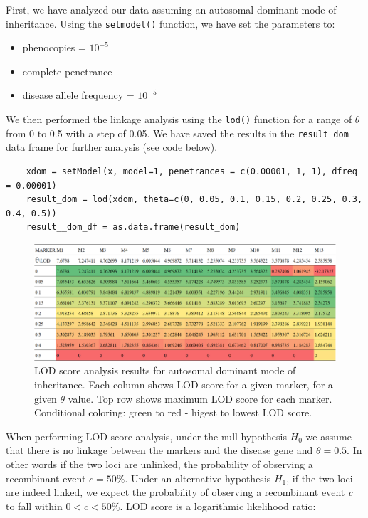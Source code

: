 \documentclass[a4paper,12pt]{article}
\begin{document}
First, we have analyzed our data assuming an autosomal dominant mode of inheritance. Using the \texttt{setmodel()} function,
we have set the parameters to:
\begin{itemize}
    \item phenocopies = $10^{-5}$
    \item complete penetrance
    \item disease allele frequency = $10^{-5}$
\end{itemize}

We then performed the linkage analysis using the \texttt{lod()} function for a range of $\theta$ from 0 to 0.5 with a step of 0.05. 
We have saved the results in the \texttt{result\_dom} data frame for further analysis (see code below).

\begin{verbatim}
    xdom = setModel(x, model=1, penetrances = c(0.00001, 1, 1), dfreq = 0.00001)
    result_dom = lod(xdom, theta=c(0, 0.05, 0.1, 0.15, 0.2, 0.25, 0.3, 0.4, 0.5)) 
    result__dom_df = as.data.frame(result_dom)
\end{verbatim}

\begin{figure}[hb!] %
    \centering
    \includegraphics[width=\textwidth]{images/xdom_lod_analysis.png}
    \caption{LOD score analysis results for autosomal dominant mode of inheritance. Each column shows 
    LOD score for a given marker, for a given $\theta$ value. Top row shows maximum LOD score for each marker. 
    Conditional coloring: green to red - higest to lowest LOD score.}   
    \label{fig:xdom_lod_score} 
    
\end{figure}

When performing LOD score analysis, under the null hypothesis $\mathit{H_0}$ we assume 
that there is no linkage between the markers and the disease gene and $\mathit{\theta = 0.5}$. In other words if the two 
loci are unlinked, the probability of observing a recombinant event $\mathit{c = 50\%}$. Under an alternative
hypothesis $\mathit{H_1}$, if the two loci are indeed linked, we expect the probability of observing a recombinant 
event \textit{c} to fall within $0 < c < 50\%$. LOD score is a logarithmic likelihood ratio:
\end{document}
